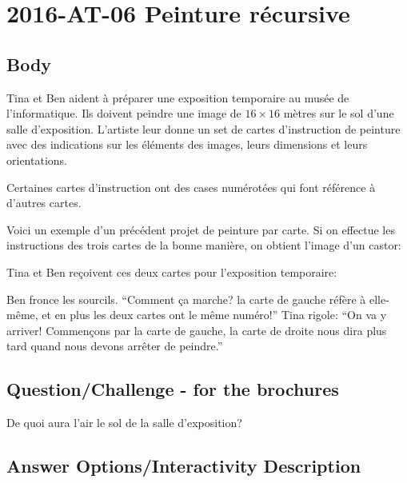 \documentclass[a4paper,11pt]{report}
\newcommand{\taskGraphicsFolder}{..}
\begin{document}
\section*{\centering{} 2016-AT-06 Peinture récursive}


\subsection*{Body}

Tina et Ben aident à préparer une exposition temporaire au musée de l’informatique. Ils doivent peindre une image de ${16 \times 16}$ mètres sur le sol d’une salle d’exposition.
L’artiste leur donne un set de cartes d’instruction de peinture avec des indications sur les éléments des images, leurs dimensions et leurs orientations.

Certaines cartes d’instruction ont des cases numérotées qui font référence à d’autres cartes.

Voici un exemple d’un précédent projet de peinture par carte. Si on effectue les instructions des trois cartes de la bonne manière, on obtient l’image d’un castor:

{\centering%
\par}

Tina et Ben reçoivent ces deux cartes pour l’exposition temporaire:

{\centering%
\par}

Ben fronce les sourcils. “Comment ça marche? la carte de gauche réfère à elle-même, et en plus les deux cartes ont le même numéro!”
Tina rigole: “On va y arriver! Commençons par la carte de gauche, la carte de droite nous dira plus tard quand nous devons arrêter de peindre.”

{\em


\subsection*{Question/Challenge - for the brochures}

De quoi aura l’air le sol de la salle d’exposition?

}

\begingroup
\renewcommand{\arraystretch}{1.5}
\subsection*{Answer Options/Interactivity Description}
\end{document}
